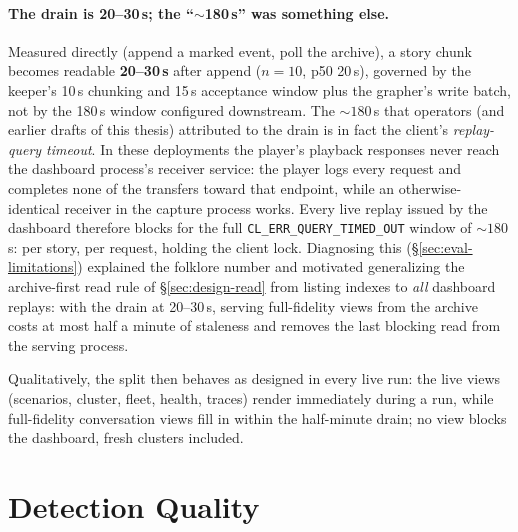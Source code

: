 \paragraph{The drain is 20--30\,s; the ``$\sim$180\,s'' was something
else.} Measured directly (append a marked event, poll the archive), a
story chunk becomes readable \textbf{20--30\,s} after append ($n{=}10$,
p50 20\,s), governed by the keeper's 10\,s chunking and 15\,s
acceptance window plus the grapher's write batch, not by the 180\,s
window configured downstream. The ${\sim}180$\,s that operators (and
earlier drafts of this thesis) attributed to the drain is in fact the
client's \emph{replay-query timeout}. In these deployments the player's
playback responses never reach the dashboard process's receiver
service: the player logs every request and completes none of the
transfers toward that endpoint, while an otherwise-identical receiver
in the capture process works. Every live replay issued by the dashboard
therefore blocks for the full \texttt{CL\_ERR\_QUERY\_TIMED\_OUT}
window of ${\sim}180$\,s: per story, per request, holding the client
lock.
Diagnosing this (\S\ref{sec:eval-limitations}) explained the
folklore number and motivated generalizing the archive-first read rule
of \S\ref{sec:design-read} from listing indexes to \emph{all} dashboard
replays: with the drain at 20--30\,s, serving full-fidelity views from
the archive costs at most half a minute of staleness and removes the
last blocking read from the serving process.

Qualitatively, the split then behaves as designed in every live run: the
live views (scenarios, cluster, fleet, health, traces) render
immediately during a run, while full-fidelity conversation views fill in
within the half-minute drain; no view blocks the dashboard, fresh
clusters included.

\section{Detection Quality}
\label{sec:eval-doctor}

